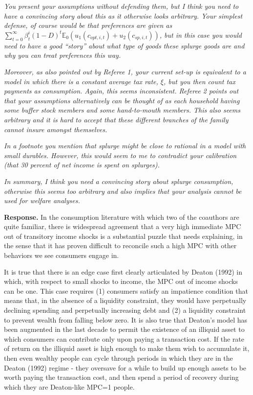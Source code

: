 \documentclass[12pt,letterpaper,english]{article}
\begin{document}
\begin{enumerate}
\textit{You present your assumptions without defending them, but I think you need to have a convincing story about this as it otherwise looks arbitrary. Your simplest defense, of course would be that preferences are given as $\sum_{t=0}^{\infty} \beta^i_t (1 - D)^{t} \mathbb{E}_0\left(u_1(c_{opt,i,t}) + u_2(c_{sp,i,t})\right)$, but in this case you would need to have a good ``story'' about what type of goods these splurge goods are and why you can treat preferences this way.}

\textit{Moreover, as also pointed out by Referee 1, your current set-up is equivalent to a model in which there is a constant average tax rate, $\xi$, but you then count tax	payments as consumption. Again, this seems inconsistent. Referee 2 points out that your assumptions alternatively can be thought of as each household having some buffer stock members and some hand-to-mouth members. This also seems arbitrary and it is hard to accept that these different branches of the family cannot insure amongst themselves.}

\textit{In a footnote you mention that splurge might be close to rational in a model with small durables. However, this would seem to me to contradict your calibration (that	30 percent of net income is spent on splurges).}

\textit{In summary, I think you need a convincing story about splurge consumption, otherwise this seems too arbitrary and also implies that your analysis cannot be used for	welfare analyses.}

\noindent \textbf{Response.} In the consumption literature with which two of the coauthors are quite familiar, there is widespread agreement that a very high immediate MPC out of transitory income shocks is a substantial puzzle that needs explaining, in the sense that it has proven difficult to reconcile such a high MPC with other behaviors we see consumers engage in.

It is true that there is an edge case first clearly articulated by Deaton (1992) in which, with respect to small shocks to income, the MPC out of income shocks can be one. This case requires (1) consumers satisfy an impatience condition that means that, in the absence of a liquidity constraint, they would have perpetually declining spending and perpetually increasing debt and (2) a liquidity constraint to prevent wealth from falling below zero. It is also true that Deaton's model has been augmented in the last decade to permit the existence of an illiquid asset to which consumers can contribute only upon paying a transaction cost.  If the rate of return on the illiquid asset is high enough to make them wish to accumulate it, then even wealthy people can cycle through periods in which they are in the Deaton (1992) regime - they oversave for a while to build up enough assets to be worth paying the transaction cost, and then spend a period of recovery during which they are Deaton-like MPC=1 people.


\end{enumerate}
\end{document}
